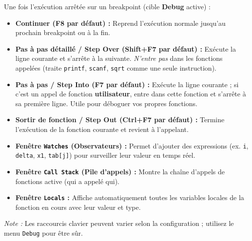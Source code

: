 \documentclass[11pt]{article}
\begin{document}
\begin{propriete}
Une fois l'exécution arrêtée sur un breakpoint (cible \textbf{Debug} active) :
\begin{itemize}
    \item \textbf{Continuer (F8 par défaut) :} Reprend l'exécution normale jusqu'au prochain breakpoint ou à la fin.
    \item \textbf{Pas à pas détaillé / Step Over (Shift+F7 par défaut) :} Exécute la ligne courante et s'arrête à la suivante. \emph{N'entre pas} dans les fonctions appelées (traite \texttt{printf}, \texttt{scanf}, \texttt{sqrt} comme une seule instruction).
    \item \textbf{Pas à pas / Step Into (F7 par défaut) :} Exécute la ligne courante ; si c'est un appel de fonction \textbf{utilisateur}, entre dans cette fonction et s'arrête à sa première ligne. Utile pour déboguer vos propres fonctions.
    \item \textbf{Sortir de fonction / Step Out (Ctrl+F7 par défaut) :} Termine l'exécution de la fonction courante et revient à l'appelant.
    \item \textbf{Fenêtre \texttt{Watches} (Observateurs) :} Permet d'ajouter des expressions (ex. \texttt{i}, \texttt{delta}, \texttt{x1}, \texttt{tab[j]}) pour surveiller leur valeur en temps réel.
    \item \textbf{Fenêtre \texttt{Call Stack} (Pile d'appels) :} Montre la chaîne d'appels de fonctions active (qui a appelé qui).
    \item \textbf{Fenêtre \texttt{Locals} :} Affiche automatiquement toutes les variables locales de la fonction en cours avec leur valeur et type.
\end{itemize}
\emph{Note :} Les raccourcis clavier peuvent varier selon la configuration ; utilisez le menu \texttt{Debug} pour être sûr.
\end{propriete}
\end{document}
